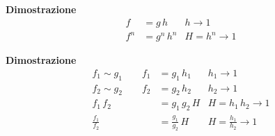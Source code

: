\documentclass[../../analisi1]{subfiles}
\begin{document}
            \begin{description}[style=nextline]
                \item[Se \(f \sim g\) allora \(f^n \sim g^n \quad \text{\emph{dove }} n \neq 0\)]
                    \textbf{Dimostrazione}
                    \begin{align*}
                        f &= g \, h & h \to 1\\
                        f^n &= g^n \, h^n & H = h^n \to 1
                    \end{align*} 
                \item[Se \(f_1 \sim g_1\) e \(f_2 \sim g_2\) allora \(f_1 \, f_2 \sim g_1 \, g_2\) e \(\frac{f_1}{f_2} \sim \frac{g_1}{g_2}\)] 
                    \textbf{Dimostrazione}
                    \begin{align*}
                        f_1 \sim g_1 \qquad f_1 &= g_1 \, h_1 & h_1 \to 1\\
                        f_2 \sim g_2 \qquad f_2 &= g_2 \, h_2 & h_2 \to 1\\
                        f_1 \, f_2 &= g_1 \, g_2 \, H & H = h_1 \, h_2 \to 1\\
                        \frac{f_1}{f_2} &= \frac{g_1}{g_2} \, H & H = \frac{h_1}{h_2} \to 1
                    \end{align*}
            \end{description}
            
\end{document}
